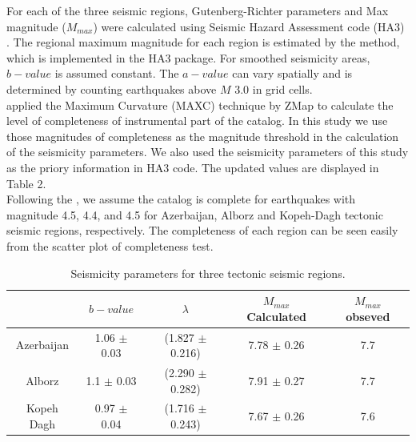 For each of the three seismic regions, Gutenberg-Richter parameters and Max magnitude ($M_{max}$) were calculated using Seismic Hazard Assessment code (HA3) \citep{kijko2004}. The regional maximum magnitude for each region is estimated by the \citet{Kijko1989} method, which is implemented in the HA3 package. For smoothed seismicity areas, $b-value$ is assumed constant. The $a-value$ can vary spatially and is determined by counting earthquakes above $M$ 3.0 in grid cells.\\
\noindent
\citet{Karimiparidari2013} applied the Maximum Curvature (MAXC) technique \citep{Wyss1999, Wiemer2000} by ZMap \citep{Wiemer2001} to calculate the level of completeness of instrumental part of the catalog. In this study we use those magnitudes of completeness as the magnitude threshold in the calculation of the seismicity parameters. We also used the seismicity parameters of this study \citep{Karimiparidari2013} as the priory information in HA3 code. The updated values are displayed in Table 2. \\
\noindent
Following the \citet{Karimiparidari2013}, we assume the catalog is complete for earthquakes with magnitude 4.5, 4.4, and 4.5 for Azerbaijan, Alborz and Kopeh-Dagh tectonic seismic regions, respectively. The completeness of each region can be seen easily from the scatter plot of completeness test. 

\begin{table}[h]
\centering
\caption{Seismicity parameters for three tectonic seismic regions.}
    \begin{tabular}{ccccc}
    ~                   & $b-value$            & $\lambda$                  & $M_{max}$ Calculated & $M_{max}$ obseved \\ \hline
    Azerbaijan    & 1.06 $\pm$ 0.03  & (1.827  $\pm$ 0.216) & 7.78  $\pm$ 0.26           & 7.7          \\ \hline
    Alborz           & 1.1  $\pm$ 0.03   & (2.290  $\pm$ 0.282) & 7.91  $\pm$ 0.27           & 7.7          \\ \hline
    Kopeh Dagh & 0.97  $\pm$ 0.04 & (1.716  $\pm$ 0.243) & 7.67  $\pm$ 0.26           & 7.6          \\
    \end{tabular}
  
\end{table}


